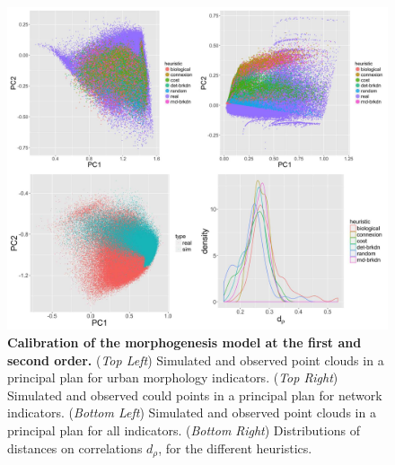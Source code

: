 \documentclass[11pt]{article}
\begin{document}
\begin{figure}
	\includegraphics[width=\linewidth]{figures/7-2-2-fig-mesocoevolmodel-calibration.jpg}
	\caption{\textbf{Calibration of the morphogenesis model at the first and second order.} (\textit{Top Left}) Simulated and observed point clouds in a principal plan for urban morphology indicators. (\textit{Top Right}) Simulated and observed could points in a principal plan for network indicators. (\textit{Bottom Left}) Simulated and observed point clouds in a principal plan for all indicators. (\textit{Bottom Right}) Distributions of distances on correlations $d_{\rho}$, for the different heuristics.\label{fig:mesocoevolmodel:calibration}}
\end{figure}
\end{document}
